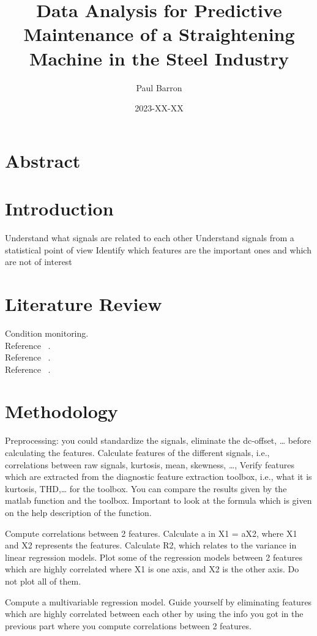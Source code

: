 \documentclass{article}
\title{Data Analysis for Predictive Maintenance of a Straightening Machine in the Steel Industry}
\date{2023-XX-XX}
\author{Paul Barron}
\begin{document}
\maketitle
\newpage
{}
\tableofcontents
\newpage
\section{Abstract}
 
\newpage
\section{Introduction}

Understand what signals are related to each other
Understand signals from a statistical point of view
Identify which features are the important ones and which are not of interest

\newpage  
\section{Literature Review}
Condition monitoring.\\
Reference ~\cite{caesarendra2017review}.\\
Reference ~\cite{james2013introduction}.\\
Reference ~\cite{soualhi2021novel}.

\newpage  
\section{Methodology}
Preprocessing: you could standardize the signals, eliminate the dc-offset, … before calculating the features.
Calculate features of the different signals, i.e., correlations between raw signals, kurtosis, mean, skewness, …,
Verify features which are extracted from the diagnostic feature extraction toolbox, i.e., what it is kurtosis, THD,… for the toolbox. You can compare the results given by the matlab function and the toolbox. Important to look at the formula which is given on the help description of the function.

Compute correlations between 2 features.
Calculate a in X1 = aX2, where X1 and X2 represents the features.
Calculate R2, which relates to the variance in linear regression models.
Plot some of the regression models between 2 features which are highly correlated where X1 is one axis, and X2 is the other axis. Do not plot all of them.

Compute a multivariable regression model.
Guide yourself by eliminating features which are highly correlated between each other by using the info you got in the previous part where you compute correlations between 2 features.
\end{document}
